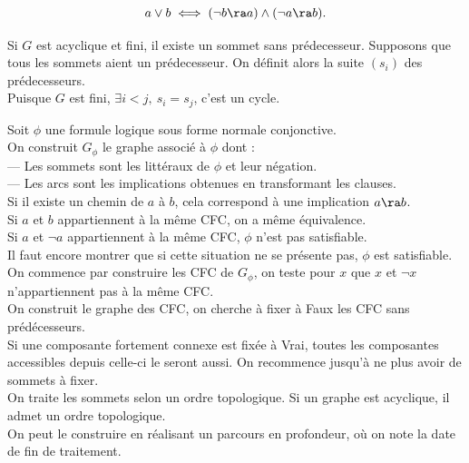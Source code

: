 \documentclass[french, 11pt]{article}
\begin{document}
\begin{lemme}{}{}
    \begin{equation*}
        a\lor b \iff (\lnot b \ra a) \land (\lnot a \ra b).
    \end{equation*}
\end{lemme}

\vspace*{-0.4cm}

\begin{lemme}{}{}
    Si $G$ est acyclique et fini, il existe un sommet sans prédecesseur.
    \tcblower
    Supposons que tous les sommets aient un prédecesseur. On définit alors la suite $(s_i)$ des prédecesseurs.\\
    Puisque $G$ est fini, $\exists i<j, ~ s_i=s_j$, c'est un cycle.
\end{lemme}

\vspace*{-0.4cm}

\begin{defi}{}{}
    Soit $\phi$ une formule logique sous forme normale conjonctive.\\
    On construit $G_\phi$ le graphe associé à $\phi$ dont :\\
    --- Les sommets sont les littéraux de $\phi$ et leur négation.\\
    --- Les arcs sont les implications obtenues en transformant les clauses.\\
    Si il existe un chemin de $a$ à $b$, cela correspond à une implication $a\ra b$.\\
    Si $a$ et $b$ appartiennent à la même CFC, on a même équivalence.\\
    Si $a$ et $\lnot a$ appartiennent à la même CFC, $\phi$ n'est pas satisfiable.\\
    Il faut encore montrer que si cette situation ne se présente pas, $\phi$ est satisfiable.\n
    On commence par construire les CFC de $G_\phi$, on teste pour $x$ que $x$ et $\lnot x$ n'appartiennent pas à la même CFC.\\
    On construit le graphe des CFC, on cherche à fixer à Faux les CFC sans prédécesseurs.\\
    Si une composante fortement connexe est fixée à Vrai, toutes les composantes accessibles depuis celle-ci le seront aussi. On recommence jusqu'à ne plus avoir de sommets à fixer.\\
    On traite les sommets selon un ordre topologique. Si un graphe est acyclique, il admet un ordre topologique.\\
    On peut le construire en réalisant un parcours en profondeur, où on note la date de fin de traitement.
\end{defi}
\end{document}
